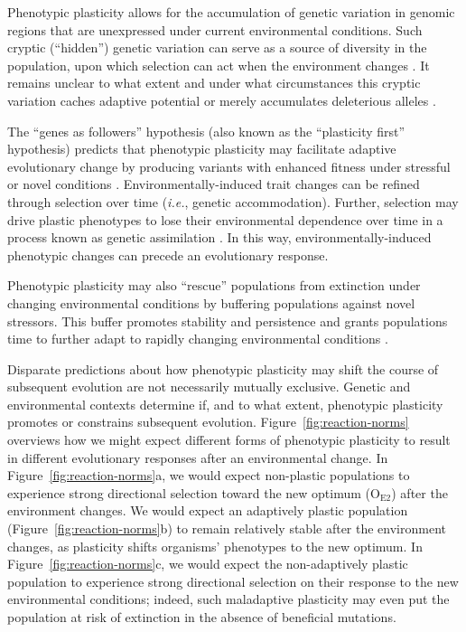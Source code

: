 \begin{raggedbottom}
Phenotypic plasticity allows for the accumulation of genetic variation in genomic regions that are unexpressed under current environmental conditions.
Such cryptic (``hidden'') genetic variation can serve as a source of diversity in the population, upon which selection can act when the environment changes \citep{schlichting_hidden_2008,levis_evaluating_2016}.
It remains unclear to what extent and under what circumstances this cryptic variation caches adaptive potential or merely accumulates deleterious alleles \citep{gibson_uncovering_2004,paaby_cryptic_2014,zheng_cryptic_2019}.

The ``genes as followers'' hypothesis (also known as the ``plasticity first'' hypothesis) predicts that phenotypic plasticity may facilitate adaptive evolutionary change by producing variants with enhanced fitness under stressful or novel conditions \citep{west-eberhard_developmental_2003,schwander_genes_2011,levis_evaluating_2016}.
Environmentally-induced trait changes can be refined through selection over time (\textit{i.e.}, genetic accommodation).
Further, selection may drive plastic phenotypes to lose their environmental dependence over time in a process known as genetic assimilation \citep{west-eberhard_developmental_2005,pigliucci_phenotypic_2006,crispo_baldwin_2007,schlichting_phenotypic_2014,levis_evaluating_2016}.
In this way, environmentally-induced phenotypic changes can precede an evolutionary response.

Phenotypic plasticity may also ``rescue'' populations from extinction under changing environmental conditions by buffering populations against novel stressors.
This buffer promotes stability and persistence and grants populations time to further adapt to rapidly changing environmental conditions \citep{west-eberhard_developmental_2003,chevin_when_2010}.

Disparate predictions about how phenotypic plasticity may shift the course of subsequent evolution are not necessarily mutually exclusive.
Genetic and environmental contexts determine if, and to what extent, phenotypic plasticity promotes or constrains subsequent evolution.
Figure~\ref{fig:reaction-norms} overviews how we might expect different forms of phenotypic plasticity to result in different evolutionary responses after an environmental change.
In Figure~\ref{fig:reaction-norms}a, we would expect non-plastic populations to experience strong directional selection toward the new optimum (O$_{\text{E}2}$) after the environment changes.
We would expect an adaptively plastic population (Figure~\ref{fig:reaction-norms}b) to remain relatively stable after the environment changes, as plasticity shifts organisms' phenotypes to the new optimum.
In Figure~\ref{fig:reaction-norms}c, we would expect the non-adaptively plastic population to experience strong directional selection on their response to the new environmental conditions; indeed, such maladaptive plasticity may even put the population at risk of extinction in the absence of beneficial mutations.


\end{raggedbottom}
